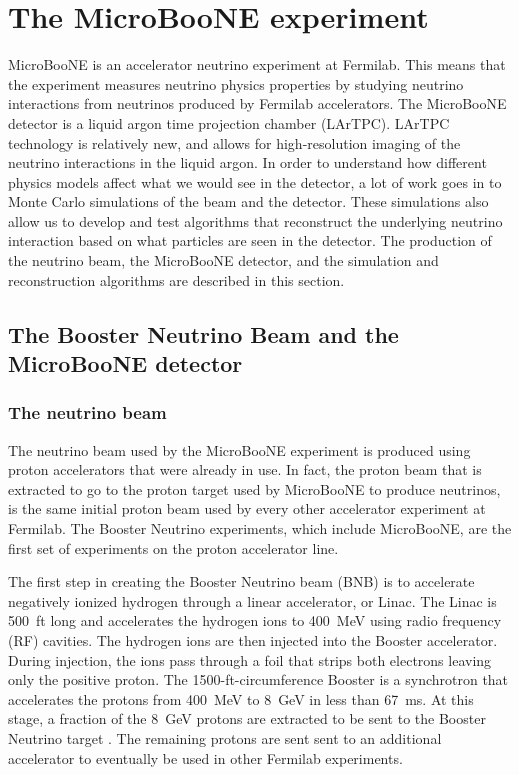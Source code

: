 \section{The MicroBooNE experiment}\label{microboone}
MicroBooNE is an accelerator neutrino experiment at Fermilab. This means that
the experiment measures neutrino physics properties by studying neutrino
interactions from neutrinos produced by Fermilab accelerators. The MicroBooNE
detector is a liquid argon time projection chamber (LArTPC). LArTPC technology
is relatively new, and allows for high-resolution imaging of the neutrino
interactions in the liquid argon. In order to understand how different physics
models affect what we would see in the detector, a lot of work goes in to Monte
Carlo simulations of the beam and the detector. These simulations also allow us
to develop and test algorithms that reconstruct the underlying neutrino
interaction based on what particles are seen in the detector. The production of
the neutrino beam, the MicroBooNE detector, and the simulation and
reconstruction algorithms are described in this section.

\subsection{The Booster Neutrino Beam and the MicroBooNE detector}\label{sec:beam}

  \subsubsection{The neutrino beam}
    The neutrino beam used by the MicroBooNE experiment is produced using proton
    accelerators that were already in use. In fact, the proton beam that is
    extracted to go to the proton target used by MicroBooNE to produce neutrinos,
    is the same initial proton beam used by every other accelerator experiment at
    Fermilab. The Booster Neutrino experiments, which include MicroBooNE, are the
    first set of experiments on the proton accelerator line.

    The first step in creating the Booster Neutrino beam (BNB) is to accelerate
    negatively ionized hydrogen through a linear accelerator, or Linac. The
    Linac is 500~ft long and accelerates the hydrogen ions to 400~MeV using
    radio frequency (RF) cavities. The hydrogen ions are then injected into the
    Booster accelerator. During injection, the ions pass through a foil that
    strips both electrons leaving only the positive proton. The
    1500-ft-circumference Booster is a synchrotron that accelerates the protons
    from 400~MeV to 8~GeV in less than 67~ms. At this stage, a fraction of the
    8~GeV protons are extracted to be sent to the Booster Neutrino target . The
    remaining protons are sent sent to an additional accelerator to eventually
    be used in other Fermilab experiments.

